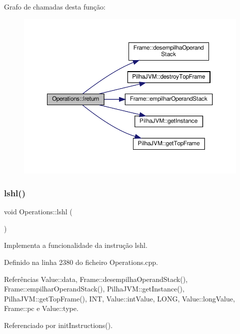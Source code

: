 Grafo de chamadas desta função\+:\nopagebreak
\begin{figure}[H]
\begin{center}
\leavevmode
\includegraphics[width=350pt]{classOperations_adbc4db2dbfcae7185bc9b7a005e988ea_cgraph}
\end{center}
\end{figure}
\mbox{\label{classOperations_a9d2b2a5ea74f26e6a5005ec9e99b24d9}} 
\subsubsection{\texorpdfstring{lshl()}{lshl()}}
{\footnotesize\ttfamily void Operations\+::lshl (\begin{DoxyParamCaption}{ }\end{DoxyParamCaption})\hspace{0.3cm}{\ttfamily [private]}}



Implementa a funcionalidade da instrução lshl. 



Definido na linha 2380 do ficheiro Operations.\+cpp.



Referências Value\+::data, Frame\+::desempilha\+Operand\+Stack(), Frame\+::empilhar\+Operand\+Stack(), Pilha\+J\+V\+M\+::get\+Instance(), Pilha\+J\+V\+M\+::get\+Top\+Frame(), I\+NT, Value\+::int\+Value, L\+O\+NG, Value\+::long\+Value, Frame\+::pc e Value\+::type.



Referenciado por init\+Instructions().

